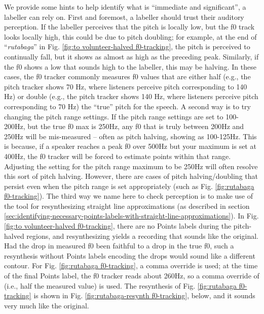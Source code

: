 \documentclass[11pt, twoside]{memoir}
\def\textlabel#1{{\relsize{-.5}\fontspec[Mapping=tex-text]{Roboto Mono}{#1}}}
\def\langtext#1{\textit{#1}}
\begin{document}
We provide some hints to help identify what is “immediate and significant”, a labeller can rely on.
First and foremost, a labeller should trust their auditory perception. If the labeller perceives that the pitch is locally low, but the f0 track looks locally high, this could be due to pitch doubling; for example, at the end of “\langtext{rutabaga}” in Fig. \ref{fig:to volunteer-halved f0-tracking}, the pitch is perceived to continually fall, but it shows as almost as high as the preceding peak. Similarly, if the f0 shows a low that sounds high to the labeller, this may be halving. In these cases, the f0 tracker commonly measures f0 values that are either half (e.g., the pitch tracker shows 70 Hz, where listeners perceive pitch corresponding to 140 Hz) or double (e.g., the pitch tracker shows 140 Hz, where listeners perceive pitch corresponding to 70 Hz) the “true” pitch for the speech.
A second way is to try changing the pitch range settings. If the pitch range settings are set to 100-200Hz, but the true f0 max is 250Hz, any f0 that is truly between 200Hz and 250Hz will be mis-measured – often as pitch halving, showing as 100-125Hz. This is because, if a speaker reaches a peak f0 over 500Hz but your maximum is set at 400Hz, the f0 tracker will be forced to estimate points within that range. Adjusting the setting for the pitch range maximum to be 250Hz will often resolve this sort of pitch halving. However, there are cases of pitch halving\slash doubling that persist even when the pitch range is set appropriately (such as Fig. \ref{fig:rutabaga f0-tracking}).
The third way we name here to check perception is to make use of the tool for resynthesizing straight line approximations (as described in section \ref{sec:identifying-necessary-points-labels-with-straight-line-approximations}). In Fig. \ref{fig:to volunteer-halved f0-tracking}, there are no Points labels during the pitch-halved regions, and resynthesizing yields a recording that sounds like the original. Had the drop in measured f0 been faithful to a drop in the true f0, such a resynthesis without Points labels encoding the drops would sound like a different contour. For Fig. \ref{fig:rutabaga f0-tracking}, a comma override is used; at the time of the final Points label, the f0 tracker reads about 260Hz, so a comma override of \textlabel{,130} (i.e., half the measured value) is used. The resynthesis of Fig. \ref{fig:rutabaga f0-tracking} is shown in Fig. \ref{fig:rutabaga-resynth f0-tracking}, below, and it sounds very much like the original.
\end{document}

